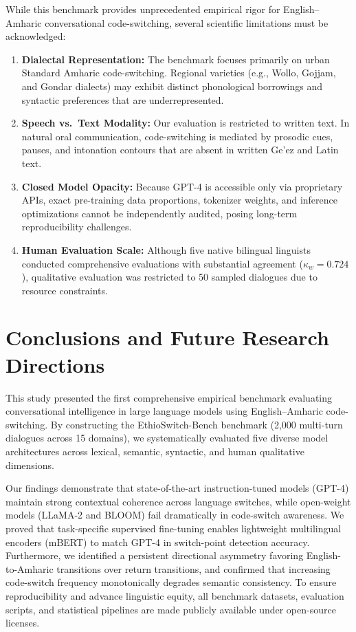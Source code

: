 \documentclass[11pt,a4paper]{article}
\begin{document}
While this benchmark provides unprecedented empirical rigor for English--Amharic conversational code-switching, several scientific limitations must be acknowledged:
\begin{enumerate}
    \item \textbf{Dialectal Representation:} The benchmark focuses primarily on urban Standard Amharic code-switching. Regional varieties (e.g., Wollo, Gojjam, and Gondar dialects) may exhibit distinct phonological borrowings and syntactic preferences that are underrepresented.
    \item \textbf{Speech vs.\ Text Modality:} Our evaluation is restricted to written text. In natural oral communication, code-switching is mediated by prosodic cues, pauses, and intonation contours that are absent in written Ge'ez and Latin text.
    \item \textbf{Closed Model Opacity:} Because GPT-4 is accessible only via proprietary APIs, exact pre-training data proportions, tokenizer weights, and inference optimizations cannot be independently audited, posing long-term reproducibility challenges.
    \item \textbf{Human Evaluation Scale:} Although five native bilingual linguists conducted comprehensive evaluations with substantial agreement ($\kappa_w = 0.724$), qualitative evaluation was restricted to 50 sampled dialogues due to resource constraints.
\end{enumerate}

\section{Conclusions and Future Research Directions}

This study presented the first comprehensive empirical benchmark evaluating conversational intelligence in large language models using English--Amharic code-switching. By constructing the EthioSwitch-Bench benchmark (2,000 multi-turn dialogues across 15 domains), we systematically evaluated five diverse model architectures across lexical, semantic, syntactic, and human qualitative dimensions.

Our findings demonstrate that state-of-the-art instruction-tuned models (GPT-4) maintain strong contextual coherence across language switches, while open-weight models (LLaMA-2 and BLOOM) fail dramatically in code-switch awareness. We proved that task-specific supervised fine-tuning enables lightweight multilingual encoders (mBERT) to match GPT-4 in switch-point detection accuracy. Furthermore, we identified a persistent directional asymmetry favoring English-to-Amharic transitions over return transitions, and confirmed that increasing code-switch frequency monotonically degrades semantic consistency. To ensure reproducibility and advance linguistic equity, all benchmark datasets, evaluation scripts, and statistical pipelines are made publicly available under open-source licenses.
\end{document}
